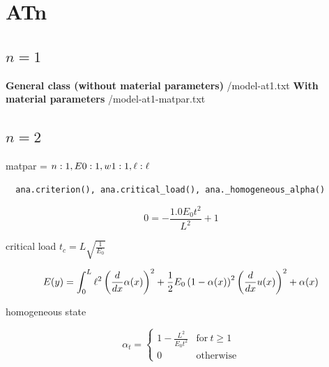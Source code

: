\documentclass[]{article}
\begin{document}
\section*{ATn}
\subsection*{$n=1$}

\textbf{General class (without material parameters)}
{/model-at1.txt}
\textbf{With material parameters}
{/model-at1-matpar.txt}



\subsection*{$n=2$}


matpar = ${n: 1, E0: 1, w1: 1, \ell: \ell}$



\begin{Verbatim}
  ana.criterion(), ana.critical_load(), ana._homogeneous_alpha()  
\end{Verbatim}



\begin{equation}
  \label{eqn:mod-criterion}
  0=- \frac{1.0 E_{0} t^{2}}{L^{2}} + 1
\end{equation}

critical load $t_c = L \sqrt{\frac{1}{E_{0}}}$

\begin{equation}
  \label{eqn:mod-energy}
E(y)  =  \int_0^L
\ell^{2} \left(\frac{d}{d x} \alpha{\left(x \right)}\right)^{2} + \frac{1}{2} E_0\left(1 - \alpha{\left(x \right)}\right)^{2} \left(\frac{d}{d x} u{\left(x \right)}\right)^{2} + \alpha{\left(x \right)}
\end{equation}


homogeneous state

\begin{equation}
  \label{eqn:mod-homogeneous}
  \alpha_t =
  \begin{cases}
    1 - \frac{L^{2}}{E_{0} t^{2}} & \text{for}\: t \geq 1 \\
    0 & \text{otherwise} \end{cases}
\end{equation}
\end{document}
